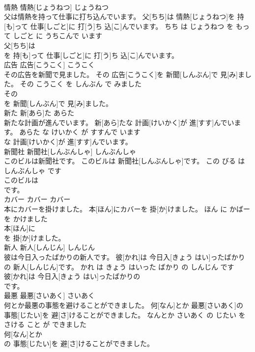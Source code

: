 \documentclass[8pt]{extreport}
\begin{document}
\begin{CJK}{UTF8}{min}
\\	情熱	情熱[じょうねつ]	じょうねつ	
\\	父は情熱を持って仕事に打ち込んでいます。	父[ちち]は 情熱[じょうねつ]を 持[も]って 仕事[しごと]に 打[う]ち 込[こ]んでいます。	ちち は じょうねつ を もって しごと に うちこんで います	
\\	父[ちち]は
\\	を 持[も]って 仕事[しごと]に 打[う]ち 込[こ]んでいます。			
\\	広告	広告[こうこく]	こうこく	
\\	その広告を新聞で見ました。	その 広告[こうこく]を 新聞[しんぶん]で 見[み]ました。	その こうこく を しんぶん で みました	
\\	その
\\	を 新聞[しんぶん]で 見[み]ました。			
\\	新た	新[あら]た	あらた	
\\	新たな計画が進んでいます。	新[あら]たな 計画[けいかく]が 進[すす]んでいます。	あらた な けいかく が すすんで います	
\\	な 計画[けいかく]が 進[すす]んでいます。			
\\	新聞社	新聞社[しんぶんしゃ]	しんぶんしゃ	
\\	このビルは新聞社です。	このビルは 新聞社[しんぶんしゃ]です。	この びる は しんぶんしゃ です	
\\	このビルは
\\	です。			
\\	カバー	カバー	カバー	
\\	本にカバーを掛けました。	本[ほん]にカバーを 掛[か]けました。	ほん に かばー を かけました	
\\	本[ほん]に
\\	を 掛[か]けました。			
\\	新人	新人[しんじん]	しんじん	
\\	彼は今日入ったばかりの新人です。	彼[かれ]は 今日入[きょう はい]ったばかりの 新人[しんじん]です。	かれ は きょう はいった ばかり の しんじん です	
\\	彼[かれ]は 今日入[きょう はい]ったばかりの
\\	です。			
\\	最悪	最悪[さいあく]	さいあく	
\\	何とか最悪の事態を避けることができました。	何[なん]とか 最悪[さいあく]の 事態[じたい]を 避[さ]けることができました。	なんとか さいあく の じたい を さける こと が できました	
\\	何[なん]とか
\\	の 事態[じたい]を 避[さ]けることができました。			

\end{CJK}
\end{document}
